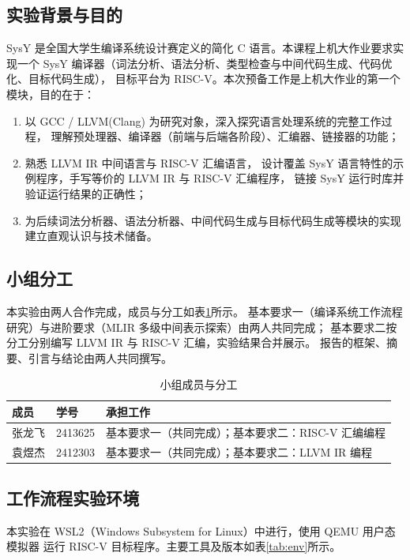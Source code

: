 \documentclass[UTF8,a4paper,10pt]{ctexart}
\begin{document}
\subsection{实验背景与目的}
SysY 是全国大学生编译系统设计赛定义的简化 C 语言。本课程上机大作业要求实现一个
SysY 编译器（词法分析、语法分析、类型检查与中间代码生成、代码优化、目标代码生成），
目标平台为 RISC-V。本次预备工作是上机大作业的第一个模块，目的在于：
\begin{enumerate}
  \item 以 GCC / LLVM(Clang) 为研究对象，深入探究语言处理系统的完整工作过程，
        理解预处理器、编译器（前端与后端各阶段）、汇编器、链接器的功能；
  \item 熟悉 LLVM IR 中间语言与 RISC-V 汇编语言，
        设计覆盖 SysY 语言特性的示例程序，手写等价的 LLVM IR 与 RISC-V 汇编程序，
        链接 SysY 运行时库并验证运行结果的正确性；
  \item 为后续词法分析器、语法分析器、中间代码生成与目标代码生成等模块的实现
        建立直观认识与技术储备。
\end{enumerate}

\subsection{小组分工}
本实验由两人合作完成，成员与分工如表\ref{tab:division}所示。
基本要求一（编译系统工作流程研究）与进阶要求（MLIR 多级中间表示探索）由两人共同完成；
基本要求二按分工分别编写 LLVM IR 与 RISC-V 汇编，实验结果合并展示。
报告的框架、摘要、引言与结论由两人共同撰写。

\begin{table}[!htbp]
  \centering
  \caption{小组成员与分工}
  \label{tab:division}
  \begin{tabular}{lll}
  \toprule
  成员 & 学号 & 承担工作\\
  \midrule
  张龙飞 & 2413625 & 基本要求一（共同完成）；基本要求二：RISC-V 汇编编程\\
  袁煜杰 & 2412303 & 基本要求一（共同完成）；基本要求二：LLVM IR 编程\\
  \bottomrule
  \end{tabular}
\end{table}

\subsection{工作流程实验环境}
本实验在 WSL2（Windows Subsystem for Linux）中进行，使用 QEMU 用户态模拟器
运行 RISC-V 目标程序。主要工具及版本如表\ref{tab:env}所示。
\end{document}
